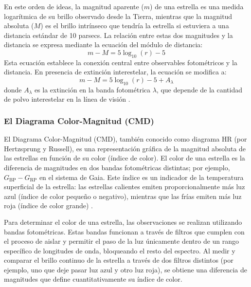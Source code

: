 \documentclass[stu, 12pt, letterpaper, donotrepeattitle, floatsintext, natbib]{apa7_ula}
\begin{document}
En este orden de ideas, la magnitud aparente ($m$) de una estrella
es una medida logarítmica de su brillo observado desde la Tierra,
mientras que la magnitud absoluta ($M$) es el brillo intrínseco
que tendría la estrella si estuviera a una distancia estándar de
10 parsecs. La relación entre estas dos magnitudes y la distancia
se expresa mediante la ecuación del módulo de distancia:
\begin{equation}
    m - M = 5\log_{10}(r) - 5
    \label{eq:distmod}
\end{equation}
Esta ecuación establece la conexión central entre observables
fotométricos y la distancia. En presencia de extinción interestelar,
la ecuación se modifica a:
\begin{equation}
    m - M = 5\log_{10}(r) - 5 + A_\lambda
    \label{eq:distmod_ext}
\end{equation}
donde $A_\lambda$ es la extinción en la banda fotométrica $\lambda$,
que depende de la cantidad de polvo interestelar en la línea de visión
\citep{Carroll_Ostlie_2017}.

\subsubsection{El Diagrama Color-Magnitud (CMD)}
El Diagrama Color-Magnitud (CMD), también conocido como diagrama HR
(por Hertzsprung y Russell), es una representación gráfica de la
magnitud absoluta de las estrellas en función de su color (índice de
color). El color de una estrella es la diferencia de magnitudes en
dos bandas fotométricas distintas; por ejemplo,
$G_{\text{BP}} - G_{\text{RP}}$ en el sistema de Gaia. Este índice es
un indicador de la temperatura superficial de la estrella: las
estrellas calientes emiten proporcionalmente más luz azul (índice de
color pequeño o negativo), mientras que las frías emiten más luz roja
(índice de color grande) \citep{Carroll_Ostlie_2017}.

Para determinar el color de una estrella, las observaciones se
realizan utilizando bandas fotométricas. Estas bandas funcionan a través de
filtros que cumplen con el proceso de aislar y permitir el paso de la luz
únicamente dentro de un rango específico de longitudes de onda, bloqueando
el resto del espectro. Al medir y comparar el brillo continuo de la estrella
a través de dos filtros distintos (por ejemplo, uno que deje pasar luz azul
y otro luz roja), se obtiene una diferencia de magnitudes que define
cuantitativamente su índice de color.
\end{document}
